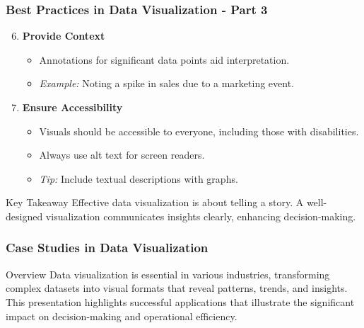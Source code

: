 \documentclass[aspectratio=169]{beamer}
\begin{document}
\begin{frame}[fragile]
    \frametitle{Best Practices in Data Visualization - Part 3}
    \begin{enumerate}
        \setcounter{enumi}{5}
        \item \textbf{Provide Context}
            \begin{itemize}
                \item Annotations for significant data points aid interpretation.
                \item \textit{Example:} Noting a spike in sales due to a marketing event.
            \end{itemize}

        \item \textbf{Ensure Accessibility}
            \begin{itemize}
                \item Visuals should be accessible to everyone, including those with disabilities.
                \item Always use alt text for screen readers.
                \item \textit{Tip:} Include textual descriptions with graphs.
            \end{itemize}
    \end{enumerate}

    \begin{block}{Key Takeaway}
        Effective data visualization is about telling a story. A well-designed visualization communicates insights clearly, enhancing decision-making.
    \end{block}
\end{frame}

\begin{frame}[fragile]
    \frametitle{Case Studies in Data Visualization}
    \begin{block}{Overview}
        Data visualization is essential in various industries, transforming complex datasets into visual formats that reveal patterns, trends, and insights. This presentation highlights successful applications that illustrate the significant impact on decision-making and operational efficiency.
    \end{block}
\end{frame}
\end{document}
